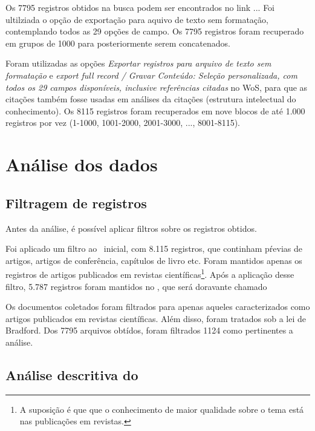 Os 7795 registros obtidos na busca podem ser encontrados no link ...
Foi ultilziada o opção de exportação para aquivo de texto sem formatação, contemplando todos as 29 opções de campo. Os 7795 registros foram recuperado em grupos de 1000 para posteriormente serem concatenados.

Foram utilizadas as opções \textit{Exportar registros para arquivo de texto sem formatação} e \textit{export full record / Gravar Conteúdo: Seleção personalizada, com todos os 29 campos disponíveis, inclusive referências citadas} no WoS, para que as citações também fosse usadas em análises da citações (estrutura intelectual do conhecimento). Os 8115 registros foram recuperados em nove blocos de até 1.000 registros por vez (1-1000, 1001-2000, 2001-3000, ..., 8001-8115).


\section{Análise dos dados}

\subsection{Filtragem de registros}
Antes da análise, é possível aplicar filtros sobre os registros obtidos.

Foi aplicado um filtro ao \dataset\   inicial, com 8.115 registros, que continham pŕevias de artigos, artigos de conferência, capítulos de livro etc. Foram mantidos apenas os registros de artigos publicados em revistas científicas\footnote{A suposição é que que o conhecimento de maior qualidade sobre o tema está nas publicações em revistas.}. Após a aplicação desse filtro, 5.787 registros foram mantidos no \dataset, que será doravante chamado

Os documentos coletados foram filtrados para apenas aqueles caracterizados como artigos publicados em revistas científicas. Além disso, foram tratados sob a lei de Bradford. Dos 7795 arquivos obtídos, foram filtrados  1124 como pertinentes a análise.

\subsection{Análise descritiva do \dataset\   }

